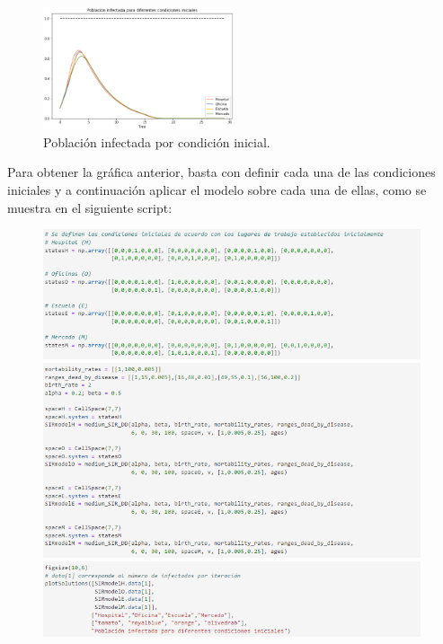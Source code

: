 \begin{figure}[h]
  \centering
    \includegraphics[width=0.5\textwidth]{Imagenes/condicionesIniciales.png}
    \caption{Población infectada por condición inicial.}
    \label{fig:condicionesIniciales}
\end{figure}

Para obtener la gráfica anterior, basta con definir cada una de las condiciones iniciales y a continuación aplicar el modelo sobre cada una de ellas, como se muestra en el siguiente script:

 \newpage

\begin{figure}[h]
  \centering
    \includegraphics[width=0.99\textwidth]{Imagenes/entornoControlado1.png}
    \includegraphics[width=0.99\textwidth]{Imagenes/entornoControlado2.png}
    \includegraphics[width=0.99\textwidth]{Imagenes/entornoControlado3.png}
\end{figure}

